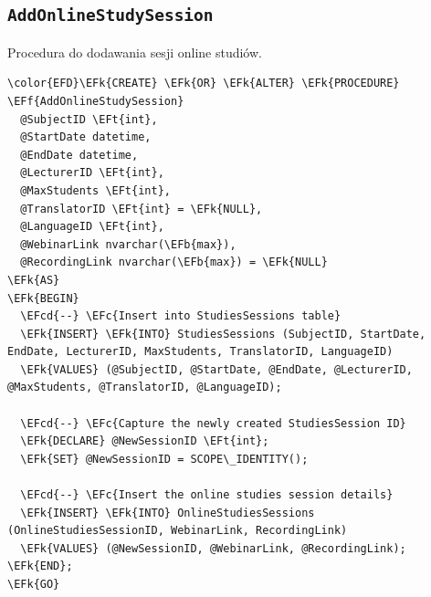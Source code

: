 \documentclass[11pt]{article}
\newcommand{\EFc}[1]{\textcolor{EFc}{\textit{#1}}} %
\newcommand{\EFcd}[1]{\textcolor{EFcd}{\textit{#1}}} %
\newcommand{\EFk}[1]{\textcolor{EFk}{\textbf{#1}}} %
\newcommand{\EFb}[1]{\textcolor{EFb}{\textbf{#1}}} %
\newcommand{\EFf}[1]{\textcolor{EFf}{#1}} %
\newcommand{\EFt}[1]{\textcolor{EFt}{\textbf{#1}}} %
\begin{document}
\subsection{\texttt{AddOnlineStudySession}}
\label{sec:org79e87f0}
Procedura do dodawania sesji online studiów.
\begin{Code}
\begin{Verbatim}
\color{EFD}\EFk{CREATE} \EFk{OR} \EFk{ALTER} \EFk{PROCEDURE} \EFf{AddOnlineStudySession}
  @SubjectID \EFt{int},
  @StartDate datetime,
  @EndDate datetime,
  @LecturerID \EFt{int},
  @MaxStudents \EFt{int},
  @TranslatorID \EFt{int} = \EFk{NULL},
  @LanguageID \EFt{int},
  @WebinarLink nvarchar(\EFb{max}),
  @RecordingLink nvarchar(\EFb{max}) = \EFk{NULL}
\EFk{AS}
\EFk{BEGIN}
  \EFcd{--} \EFc{Insert into StudiesSessions table}
  \EFk{INSERT} \EFk{INTO} StudiesSessions (SubjectID, StartDate, EndDate, LecturerID, MaxStudents, TranslatorID, LanguageID)
  \EFk{VALUES} (@SubjectID, @StartDate, @EndDate, @LecturerID, @MaxStudents, @TranslatorID, @LanguageID);

  \EFcd{--} \EFc{Capture the newly created StudiesSession ID}
  \EFk{DECLARE} @NewSessionID \EFt{int};
  \EFk{SET} @NewSessionID = SCOPE\_IDENTITY();

  \EFcd{--} \EFc{Insert the online studies session details}
  \EFk{INSERT} \EFk{INTO} OnlineStudiesSessions (OnlineStudiesSessionID, WebinarLink, RecordingLink)
  \EFk{VALUES} (@NewSessionID, @WebinarLink, @RecordingLink);
\EFk{END};
\EFk{GO}
\end{Verbatim}
\end{Code}
\end{document}
